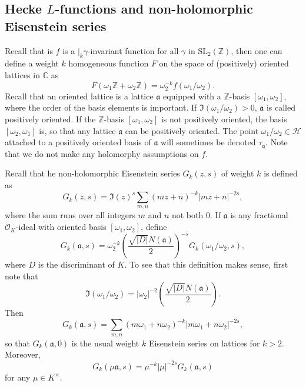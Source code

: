 \documentclass[twoside,10pt]{article}
\newcommand{\Z}{\mathbb{Z}}
\newcommand{\C}{\mathbb{C}}
\newcommand{\dashk}{\vert_{k}}
\renewcommand{\H}{\mathcal{H}}
\newcommand{\SL}{\textrm{SL}_2(\mathbb{Z})}
\newcommand{\ida}{\mathfrak{a}}
\renewcommand{\O}{\mathcal{O}}
\newcommand{\latbasis}{[\omega_1,\omega_2]}
\newcommand{\omquot}{\omega_1/\omega_2}
\begin{document}
\subsection{Hecke $L$-functions and non-holomorphic Eisenstein series}
Recall that is $f$ is a $\dashk\gamma$-invariant function for all $\gamma$ in $\SL$, then one can define a weight $k$ homogeneous function $F$ on the space of (positively) oriented lattices in $\C$ as
\[F(\omega_1\Z+\omega_2\Z)=\omega_2^{-k}f(\omega_1/\omega_2).\]
Recall that an oriented lattice is a lattice $\ida$ equipped with a $\Z$-basis $\latbasis$, where the order of the basis elements is important. If $\Im(\omquot)>0$, $\ida$ is called positively oriented. If the $\Z$-basis $\latbasis$ is not positively oriented, the basis $[\omega_2,\omega_1]$ is, so that any lattice $\ida$ can be positively oriented. The point $\omquot\in\H$ attached to a positively oriented basis of $\ida$ will sometimes be denoted $\tau_\ida$. Note that we do not make any holomorphy assumptions on $f$.

Recall that he non-holomorphic Eisenstein series $G_k(z,s)$ of weight $k$ is defined as
\[G_k(z,s)=\Im(z)^s\sum_{m,n}(mz+n)^{-k}|mz+n|^{-2s},\]
where the sum runs over all integers $m$ and $n$ not both $0$. If $\ida$ is any fractional $\O_K$-ideal with oriented basis $\latbasis$, define
\[G_k(\ida,s)=\omega_2^{-k}\left (\frac{\sqrt{|D|}N(\ida)}{2}\right )^{-s}G_k(\omquot,s),\]
where $D$ is the discriminant of $K$. To see that this definition makes sense, first note that
\begin{equation}\label{eq:idealnorm}
\Im(\omquot)=|\omega_2|^{-2}\left (\frac{\sqrt{|D|}N(\ida)}{2}\right ).
\end{equation}
Then
\[G_k(\ida,s)=\sum_{m,n}(m\omega_1+n\omega_2)^{-k}|m\omega_1+n\omega_2|^{-2s},\]
so that $G_k(\ida,0)$ is the usual weight $k$ Eisenstein series on lattices for $k>2$. Moreover,
\[G_k(\mu\ida,s)=\mu^{-k}|\mu|^{-2s}G_k(\ida,s)\]
for any $\mu\in K^\times$.
\end{document}
